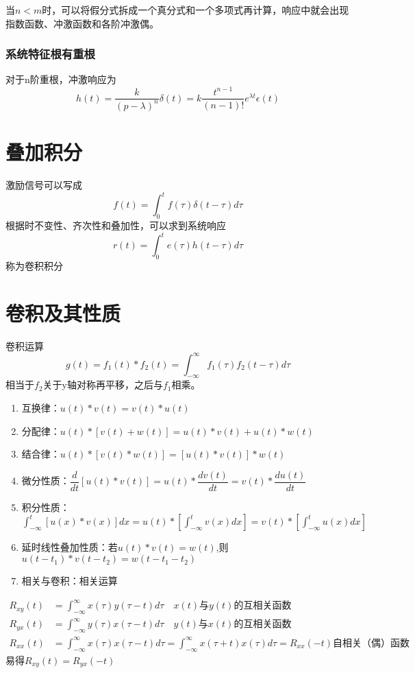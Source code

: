 当$n<m$时，可以将假分式拆成一个真分式和一个多项式再计算，响应中就会出现指数函数、冲激函数和各阶冲激偶。
\subsubsection{系统特征根有重根}
对于n阶重根，冲激响应为
\begin{equation}
    h(t)=\dfrac{k}{(p-\lambda)^n}\delta(t)=k\dfrac{t^{n-1}}{(n-1)!}e^{\lambda t}\epsilon(t)
\end{equation}
\section{叠加积分}
激励信号可以写成
\begin{equation}
    f(t)=\int_0^t f(\tau) \delta(t-\tau)d\tau
\end{equation}
根据时不变性、齐次性和叠加性，可以求到系统响应
\begin{equation}
    r(t)=\int_0^t e(\tau)h(t-\tau)d \tau
\end{equation}
称为卷积积分
\section{卷积及其性质}
卷积运算
\begin{equation}
    g(t)=f_1(t)*f_2(t)=\int_{-\infty}^{\infty}f_1(\tau)f_2(t-\tau) d\tau
\end{equation}
相当于$f_2$关于y轴对称再平移，之后与$f_1$相乘。
\begin{enumerate}
    \item 互换律：$u(t)*v(t)=v(t)*u(t)$
    \item 分配律：$u(t)*[v(t)+w(t)]=u(t)*v(t)+u(t)*w(t)$
    \item 结合律：$u(t)*[v(t)*w(t)]=[u(t)*v(t)]*w(t)$
    \item 微分性质：$\dfrac{d}{dt}[u(t)*v(t)]=u(t)*\dfrac{dv(t)}{dt}=v(t)*\dfrac{du(t)}{dt}$
    \item 积分性质：$\int_{-\infty}^t[u(x)*v(x)]dx=u(t)*[\int_{-\infty}^t v(x)dx]=v(t)*[\int_{-\infty}^t u(x)dx]$
    \item 延时线性叠加性质：若$u(t)*v(t)=w(t)$,则$u(t-t_1)*v(t-t_2)=w(t-t_1-t_2)$
    \item 相关与卷积：相关运算
\end{enumerate}
\begin{align}
    R_{xy}(t)&=\int_{-\infty}^\infty x(\tau)y(\tau-t)d\tau \quad x(t)\text{与}y(t)\text{的互相关函数}\\
    R_{yx}(t)&=\int_{-\infty}^\infty y(\tau)x(\tau-t)d\tau \quad y(t)\text{与}x(t)\text{的互相关函数}\\
    R_{xx}(t)&=\int_{-\infty}^\infty x(\tau)x(\tau-t)d\tau =\int_{-\infty}^\infty x(\tau +t)x(\tau)d\tau=R_{xx}(-t) \text{自相关（偶）函数}
\end{align}
易得$R_{xy}(t)=R_{yx}(-t)$

